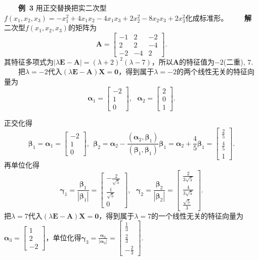 \documentclass[compress,mathserif,cjk]{beamer}
\theoremstyle{remark}
\numberwithin{equation}{section}
\newcommand{\hei}{\bf}      %
\begin{document}
\begin{CJK}{UTF8}{gbsn}
\begin{frame}
\ \ \ \ {\hei 例~3} 用正交替换把实二次型$f(x_1,x_2,x_3)=-x_1^2+4x_1x_2-4x_1x_3+2x_2^2-8x_2x_3+2x_3^2$化成标准形。
\pause\vskip 5pt
\ \ \ \ {\hei 解} 二次型$f(x_1,x_2,x_3)$的矩阵为
$$\bm A=\left[\begin{matrix}-1&2&-2\\2&2&-4\\-2&-4&2\end{matrix}\right].$$
其特征多项式为$|\lambda\bm E-\bm A|=(\lambda+2)^2(\lambda-7)$，所以$\bm A$的特征值为$-2$(二重), $7$.
\pause\vskip 5pt
\ \ \ \ 把$\lambda=-2$代入$(\lambda\bm E-\bm A)\bm X=\bm 0$，得到属于$\lambda=-2$的两个线性无关的特征向量为
$$\bm\alpha_1=\left[\begin{matrix}-2\\1\\0\end{matrix}\right],~~~\bm\alpha_2=\left[\begin{matrix}2\\0\\1\end{matrix}\right].$$
\end{frame}

\begin{frame}
正交化得
$$\bm\beta_1=\bm\alpha_1=\left[\begin{matrix}-2\\1\\0\end{matrix}\right],~~\bm\beta_2=\bm\alpha_2-\frac{(\bm\alpha_2,\bm\beta_1)}{(\bm\beta_1,\bm\beta_1)}\bm\beta_1
=\bm\alpha_2+\frac{4}5\bm\beta_1=\left[\begin{matrix}\frac{2}5\\[0.3em]\frac{4}5\\[0.1em]1\end{matrix}\right].$$
再单位化得
$$\bm\gamma_1=\frac{\bm\beta_1}{|\bm\beta_1|}=\left[\begin{matrix}-\frac{2}{\sqrt 5}\\[0.5em]\frac{1}{\sqrt 5}\\[0.3em]0\end{matrix}\right],~~~
\bm\gamma_2=\frac{\bm\beta_2}{|\bm\beta_2|}=\left[\begin{matrix}\frac{2}{3\sqrt 5}\\[0.5em]\frac{4}{3\sqrt 5}\\[0.5em]\frac{\sqrt 5}3\end{matrix}\right].$$
\pause 把$\lambda=7$代入$(\lambda\bm E-\bm A)\bm X=\bm 0$，得到属于$\lambda=7$的一个线性无关的特征向量为$\bm\alpha_3=\left[\begin{matrix}1\\2\\-2\end{matrix}\right]$，单位化得$\bm\gamma_3=\frac{\bm\alpha_3}{|\bm\alpha_3|}=\left[\begin{matrix}\frac{1}3\\[0.3em]\frac{2}3\\[0.3em]-\frac{2}3\end{matrix}\right]$.
\end{frame}


\end{CJK}
\end{document}
